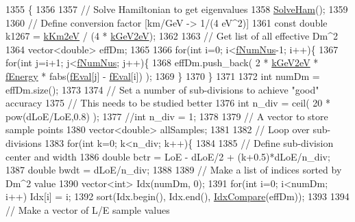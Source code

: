 \begin{DoxyCode}
1355 \{
1356 
1357   \textcolor{comment}{// Solve Hamiltonian to get eigenvalues}
1358   \hyperlink{classOscProb_1_1PMNS__Base_a91f065cb9e910e0095e41462b4420b01}{SolveHam}();
1359 
1360   \textcolor{comment}{// Define conversion factor [km/GeV -> 1/(4 eV^2)]}
1361   \textcolor{keyword}{const} \textcolor{keywordtype}{double} k1267 = \hyperlink{classOscProb_1_1PMNS__Base_a382ddd7b76ca89b43f22614a2ea7327b}{kKm2eV} / (4 * \hyperlink{classOscProb_1_1PMNS__Base_ad36a0a6bf58d6ec093d3947784bd89e9}{kGeV2eV});
1362 
1363   \textcolor{comment}{// Get list of all effective Dm^2}
1364   vector<double> effDm;
1365 
1366   \textcolor{keywordflow}{for}(\textcolor{keywordtype}{int} i=0; i<\hyperlink{classOscProb_1_1PMNS__Base_a24bb74bed63569dfe88b18fa6a08060e}{fNumNus}-1; i++)\{
1367     \textcolor{keywordflow}{for}(\textcolor{keywordtype}{int} j=i+1; j<\hyperlink{classOscProb_1_1PMNS__Base_a24bb74bed63569dfe88b18fa6a08060e}{fNumNus}; j++)\{
1368       effDm.push\_back( 2 * \hyperlink{classOscProb_1_1PMNS__Base_ad36a0a6bf58d6ec093d3947784bd89e9}{kGeV2eV} * \hyperlink{classOscProb_1_1PMNS__Base_a2800af6d436972f3e900867790c046b0}{fEnergy} * fabs(\hyperlink{classOscProb_1_1PMNS__Base_a6319c34d7decbb9d7d6da279c06e8c2d}{fEval}[j] - 
      \hyperlink{classOscProb_1_1PMNS__Base_a6319c34d7decbb9d7d6da279c06e8c2d}{fEval}[i]) );
1369     \}
1370   \}
1371 
1372   \textcolor{keywordtype}{int} numDm = effDm.size();
1373 
1374   \textcolor{comment}{// Set a number of sub-divisions to achieve "good" accuracy}
1375   \textcolor{comment}{// This needs to be studied better}
1376   \textcolor{keywordtype}{int} n\_div = ceil( 20 * pow(dLoE/LoE,0.8) );
1377   \textcolor{comment}{//int n\_div = 1;}
1378 
1379   \textcolor{comment}{// A vector to store sample points}
1380   vector<double> allSamples;
1381 
1382   \textcolor{comment}{// Loop over sub-divisions}
1383   \textcolor{keywordflow}{for}(\textcolor{keywordtype}{int} k=0; k<n\_div; k++)\{
1384 
1385     \textcolor{comment}{// Define sub-division center and width}
1386     \textcolor{keywordtype}{double} bctr = LoE - dLoE/2 + (k+0.5)*dLoE/n\_div;
1387     \textcolor{keywordtype}{double} bwdt = dLoE/n\_div;
1388 
1389     \textcolor{comment}{// Make a list of indices sorted by Dm^2 value}
1390     vector<int> Idx(numDm, 0);
1391     \textcolor{keywordflow}{for}(\textcolor{keywordtype}{int} i=0; i<numDm; i++) Idx[i] = i;
1392     sort(Idx.begin(), Idx.end(), \hyperlink{structOscProb_1_1IdxCompare}{IdxCompare}(effDm));
1393 
1394     \textcolor{comment}{// Make a vector of L/E sample values}

\end{DoxyCode}

